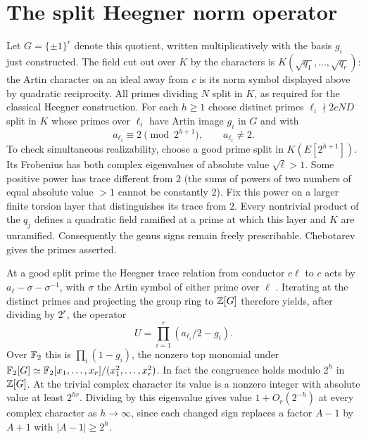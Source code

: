 \documentclass[11pt]{article}
\begin{document}
\section{The split Heegner norm operator}
Let $G=\{\pm1\}^r$ denote this quotient, written multiplicatively
with the basis $g_i$ just constructed. The field cut out over $K$
by the characters is $K(\sqrt{q_1},\ldots,\sqrt{q_r})$:
the Artin character on an ideal away from $c$ is its norm symbol
displayed above by quadratic reciprocity. All primes dividing $N$ split
in $K$, as required for the classical Heegner construction. For
each $h\ge1$ choose distinct primes $\ell_i\nmid2cND$ split in $K$
whose primes over $\ell_i$ have Artin image $g_i$ in $G$ and with
\[
             a_{\ell_i}\equiv 2\pmod{2^{h+1}},\qquad
             a_{\ell_i}\ne2 .
\]
To check simultaneous realizability, choose a good prime split in
$K(E[2^{h+1}])$. Its Frobenius has both complex eigenvalues of
absolute value $\sqrt\ell>1$. Some positive power has trace
different from $2$ (the sums of powers of two numbers of equal
absolute value $>1$ cannot be constantly $2$). Fix this power on a
larger finite torsion layer that distinguishes its trace from $2$.
Every nontrivial product of the $q_j$ defines a quadratic field
ramified at a prime at which this layer and $K$ are unramified.
Consequently the genus signs remain freely prescribable. Chebotarev
gives the primes asserted.

At a good split prime the Heegner trace relation from conductor
$c\ell$ to $c$ acts by $a_\ell-\sigma-\sigma^{-1}$, with $\sigma$
the Artin symbol of either prime over $\ell$ \cite{Darmon}.
Iterating at the distinct primes and projecting the group ring to
$\mathbb Z[G]$ therefore yields, after dividing by $2^r$, the operator
\[
 U=\prod_{i=1}^r(a_{\ell_i}/2-g_i).
\]
Over $\mathbb F_2$ this is $\prod_i(1-g_i)$, the nonzero top monomial
under $\mathbb F_2[G]\simeq \mathbb F_2[x_1,\ldots,x_r]/(x_1^2,\ldots,x_r^2)$.
In fact the congruence holds modulo $2^h$ in $\mathbb Z[G]$. At the
trivial complex character its value is a nonzero integer with
absolute value at least $2^{hr}$. Dividing by this eigenvalue
gives value $1+O_r(2^{-h})$ at every complex character as $h\to\infty$,
since each changed sign replaces a factor $A-1$ by $A+1$ with
$|A-1|\ge2^h$.
\end{document}
